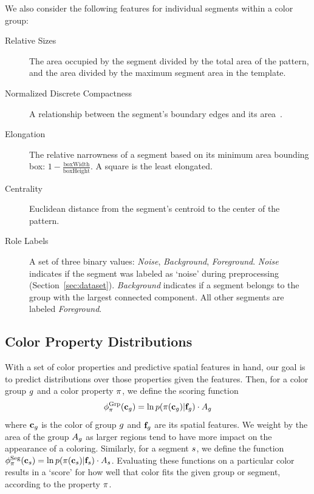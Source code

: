 We also consider the following features for individual segments within a color group:
\begin{description}
	\item[Relative Sizes] The area occupied by the segment divided by the total area of the pattern, and the area divided by the maximum segment area in the template.
  \item[Normalized Discrete Compactness] A relationship between the segment's boundary edges and its area~\cite{NormalizedDiscreteCompactness}.
  \item[Elongation] The relative narrowness of a segment based on its minimum area bounding box: $1-\frac{\textrm{boxWidth}}{\textrm{boxHeight}}$. A square is the least elongated.
  \item[Centrality] Euclidean distance from the segment's centroid to the center of the pattern.
  \item[Role Labels] A set of three binary values: {\emph{Noise}, \emph{Background}, \emph{Foreground}}. \emph{Noise} indicates if the segment was labeled as `noise' during preprocessing (Section~\ref{sec:dataset}). \emph{Background} indicates if a segment belongs to the group with the largest connected component. All other segments are labeled \emph{Foreground}.
\end{description}

\subsection{Color Property Distributions}
\label{sec:unaryDistribs}

With a set of color properties and predictive spatial features in hand, our goal is to predict distributions over those properties given the features. Then, for a color group $g$ and a color property $\pi$, we define the scoring function
\begin{equation*}
\phi^{\textrm{Grp}}_\pi(\mathbf{c}_g) =  \ln p( \pi( \mathbf{c}_g ) | \mathbf{f}_g ) \cdot A_g
\end{equation*}
where $\mathbf{c}_g$ is the color of group $g$ and $\mathbf{f}_g$ are its spatial features. We weight by the area of the group $A_g$ as larger regions tend to have more impact on the appearance of a coloring. Similarly, for a segment $s$, we define the function $\phi^{\textrm{Seg}}_\pi(\mathbf{c}_s) = \ln p( \pi( \mathbf{c}_s ) | \mathbf{f}_s) \cdot A_s$. Evaluating these functions on a particular color results in a `score' for how well that color fits the given group or segment, according to the property $\pi$.

